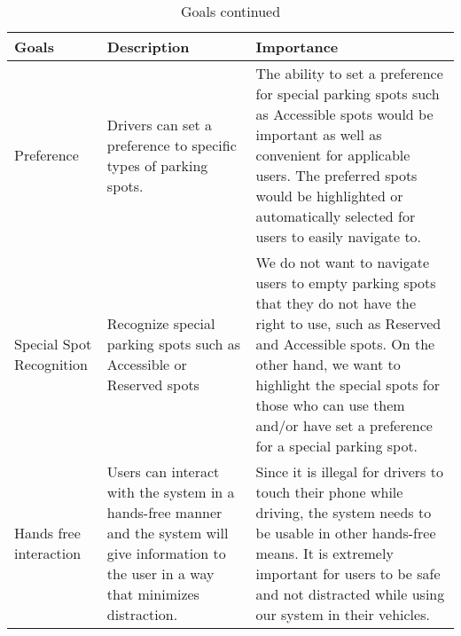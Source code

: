 \documentclass[12pt,letterpaper]{article}
\begin{document}
\begin{table}[hp]
\begin{tabularx}{\textwidth}{|X|X|X|}
\toprule
\textbf{Goals} & \textbf{Description} & \textbf{Importance}\\
\midrule
Preference & Drivers can set a preference to specific types of parking spots. &
The ability to set a preference for special parking spots such as Accessible
spots would be important as well as convenient for applicable users. The
preferred spots would be highlighted or automatically selected for users to
easily navigate to.\\
\hline
Special Spot Recognition & Recognize special parking spots such as Accessible or
Reserved spots & We do not want to navigate users to empty parking spots that
they do not have the right to use, such as Reserved and Accessible spots. On the
other hand, we want to highlight the special spots for those who can use them
and/or have set a preference for a special parking spot. \\
\hline
Hands free interaction & Users can interact with the system in a hands-free
manner and the system will give information to the user in a way that minimizes
distraction. & Since it is illegal for drivers to touch their phone while
driving, the system needs to be usable in other hands-free means. It is
extremely important for users to be safe and not distracted while using our
system in their vehicles.\\
\bottomrule
\end{tabularx}
\caption{Goals continued} \label{TblGoals} 
\end{table}


\newpage

\end{document}
